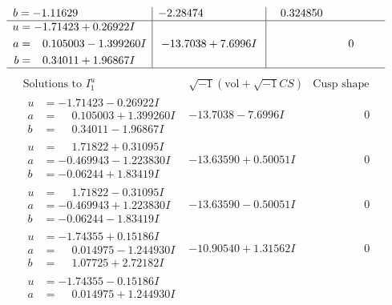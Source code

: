 \documentclass[1p]{elsarticle_modified}
\theoremstyle{definition}
\newcommand{\I}{\sqrt{-1}}
\begin{document}
$$\begin{array}{c|c|c}
\begin{aligned}
b &= -1.11629\phantom{ +0.000000I}\end{aligned}
 & -2.28474\phantom{ +0.000000I} & \phantom{-}0.324850\phantom{ +0.000000I} \\ \hline\begin{aligned}
u &= -1.71423 + 0.26922 I \\
a &= \phantom{-}0.105003 - 1.399260 I \\
b &= \phantom{-}0.34011 + 1.96867 I\end{aligned}
 & -13.7038 + 7.6996 I & \phantom{-0.000000 } 0\\
 \hline 
 \end{array}$$\newpage$$\begin{array}{c|c|c}  
\text{Solutions to }I^u_{1}& \I (\text{vol} + \sqrt{-1}CS) & \text{Cusp shape}\\
 \hline 
\begin{aligned}
u &= -1.71423 - 0.26922 I \\
a &= \phantom{-}0.105003 + 1.399260 I \\
b &= \phantom{-}0.34011 - 1.96867 I\end{aligned}
 & -13.7038 - 7.6996 I & \phantom{-0.000000 } 0 \\ \hline\begin{aligned}
u &= \phantom{-}1.71822 + 0.31095 I \\
a &= -0.469943 - 1.223830 I \\
b &= -0.06244 + 1.83419 I\end{aligned}
 & -13.63590 + 0.50051 I & \phantom{-0.000000 } 0 \\ \hline\begin{aligned}
u &= \phantom{-}1.71822 - 0.31095 I \\
a &= -0.469943 + 1.223830 I \\
b &= -0.06244 - 1.83419 I\end{aligned}
 & -13.63590 - 0.50051 I & \phantom{-0.000000 } 0 \\ \hline\begin{aligned}
u &= -1.74355 + 0.15186 I \\
a &= \phantom{-}0.014975 - 1.244930 I \\
b &= \phantom{-}1.07725 + 2.72182 I\end{aligned}
 & -10.90540 + 1.31562 I & \phantom{-0.000000 } 0 \\ \hline\begin{aligned}
u &= -1.74355 - 0.15186 I \\
a &= \phantom{-}0.014975 + 1.244930 I \\

\end{aligned}
\end{array}$$
\end{document}
